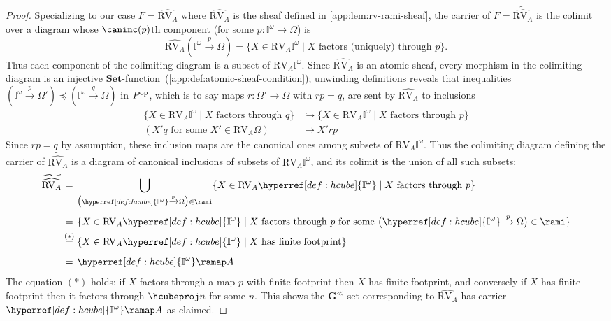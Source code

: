 \documentclass[
  sigconf,
  screen, ]{acmart}
\theoremstyle{definition}
\newcommand\nref[2]{\hyperref[#1]{#2}} \newcommand\checkhigh{{\huge{\color{red}\textbf{TODO: check}}}}
\newcommand\op{^{\rm op}}
\newcommand\Set{\mathbf{Set}}
\newcommand\texhcube{{{{\mathbb I}^\omega}}}
\newcommand\hcube{{\nref{def:hcube}{\texhcube}}}
\newcommand\RV{\mathrm{RV}}
\newcommand\texauti{\mathbf{G}^{\ll}}
\newcommand\auti{{\nref{def:auti}{\texauti}}}
\begin{document}
\begin{proof}
  Specializing to our case $F = \widehat{\RV_A}$
  where $\widehat{\RV_A}$ is the sheaf defined in 
  \cref{app:lem:rv-rami-sheaf}, the carrier of $
  \widetilde F = \widetilde{\widehat {\RV_A}}$
  is the colimit over a diagram
  whose $\caninc(p)$th component (for some $p :\hcube\to \Omega$)
  is
  \[
    \widehat{\RV_A}(\hcube\xrightarrow p \Omega)
    = \{ X\in \RV_A\hcube \mid \text{$X$ factors (uniquely) through $p$}\}.
  \]
  Thus each component of the colimiting diagram is a subset of $\RV_A\hcube$.
  Since $\widehat{\RV_A}$ is an atomic sheaf, every morphism in the colimiting diagram
  is an injective $\Set$-function~(\cref{app:def:atomic-sheaf-condition});
  unwinding definitions reveals that inequalities $(\hcube\xrightarrow p\Omega')\preceq (\hcube\xrightarrow q\Omega)$ in $P\op$,
  which is to say maps $r : \Omega'\to\Omega$ with $rp = q$,
  are sent by $\widehat{\RV_A}$
  to inclusions
  \begin{align*}
    \{X\in \RV_A\hcube\mid \text{$X$ factors through $q$}\}
    &\hookrightarrow
    \{X\in \RV_A\hcube\mid \text{$X$ factors through $p$}\}
    \\
    (X'q\text{ for some }X'\in\RV_A\Omega)
    &\mapsto
    X'rp
  \end{align*}
  Since $rp = q$ by assumption, these inclusion maps
  are the canonical ones among subsets of $\RV_A\hcube$.
  Thus the colimiting diagram defining the carrier of $\widetilde{\widehat{\RV_A}}$
  is a diagram of canonical inclusions of subsets of $\RV_A\hcube$,
  and its colimit is the union of all such subsets:
  \begin{align*}
    \widetilde{\widehat{\RV_A}}
    &\stackrel{\phantom{(*)}}= \bigcup_{\big(\hcube\xrightarrow p\Omega\big)\in\rami}\{X\in \RV_A\hcube\mid \text{$X$ factors through $p$}\}\\
    &\stackrel{\phantom{(*)}}= \{X\in \RV_A\hcube\mid \text{$X$ factors through $p$ for some $\big(\hcube\xrightarrow p\Omega\big)\in\rami$}\}\\
    &\stackrel{(*)}= \{X\in \RV_A\hcube\mid \text{$X$ has finite footprint}\}\\
    &\stackrel{\phantom{(*)}}= \hcube\ramap A
  \end{align*}
  The equation $(*)$ holds: if $X$ factors through a map $p$ with finite footprint
  then $X$ has finite footprint, and conversely if $X$ has finite footprint
  then it factors through $\hcubeproj n$ for some $n$.
  This shows the $\auti$-set corresponding to $\widehat{\RV_A}$
  has carrier $\hcube\ramap A$ as claimed.


\end{proof}
\end{document}
